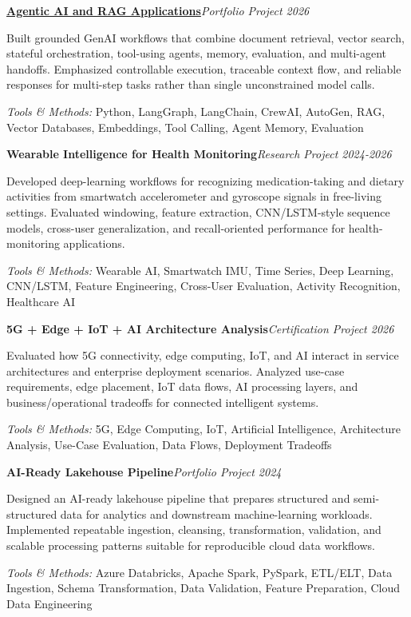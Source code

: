 \documentclass[9pt,letterpaper]{extarticle}
\newcommand{\entry}[2]{\Needspace{4\baselineskip}\textbf{#1}\hfill\textit{#2}\par}
\begin{document}
\entry{\href{https://github.com/WaseemRaza844/agentic-ai-projects-by-was}{Agentic AI and RAG Applications}}{Portfolio Project \textbar{} 2026}
Built grounded GenAI workflows that combine document retrieval, vector search, stateful orchestration, tool-using agents, memory, evaluation, and multi-agent handoffs. Emphasized controllable execution, traceable context flow, and reliable responses for multi-step tasks rather than single unconstrained model calls.\par
{\small\textit{Tools \& Methods:} Python, LangGraph, LangChain, CrewAI, AutoGen, RAG, Vector Databases, Embeddings, Tool Calling, Agent Memory, Evaluation\par}
\vspace{1pt}
\entry{Wearable Intelligence for Health Monitoring}{Research Project \textbar{} 2024-2026}
Developed deep-learning workflows for recognizing medication-taking and dietary activities from smartwatch accelerometer and gyroscope signals in free-living settings. Evaluated windowing, feature extraction, CNN/LSTM-style sequence models, cross-user generalization, and recall-oriented performance for health-monitoring applications.\par
{\small\textit{Tools \& Methods:} Wearable AI, Smartwatch IMU, Time Series, Deep Learning, CNN/LSTM, Feature Engineering, Cross-User Evaluation, Activity Recognition, Healthcare AI\par}
\vspace{1pt}
\entry{5G + Edge + IoT + AI Architecture Analysis}{Certification Project \textbar{} 2026}
Evaluated how 5G connectivity, edge computing, IoT, and AI interact in service architectures and enterprise deployment scenarios. Analyzed use-case requirements, edge placement, IoT data flows, AI processing layers, and business/operational tradeoffs for connected intelligent systems.\par
{\small\textit{Tools \& Methods:} 5G, Edge Computing, IoT, Artificial Intelligence, Architecture Analysis, Use-Case Evaluation, Data Flows, Deployment Tradeoffs\par}
\vspace{1pt}
\entry{AI-Ready Lakehouse Pipeline}{Portfolio Project \textbar{} 2024}
Designed an AI-ready lakehouse pipeline that prepares structured and semi-structured data for analytics and downstream machine-learning workloads. Implemented repeatable ingestion, cleansing, transformation, validation, and scalable processing patterns suitable for reproducible cloud data workflows.\par
{\small\textit{Tools \& Methods:} Azure Databricks, Apache Spark, PySpark, ETL/ELT, Data Ingestion, Schema Transformation, Data Validation, Feature Preparation, Cloud Data Engineering\par}
\vspace{1pt}
\end{document}
